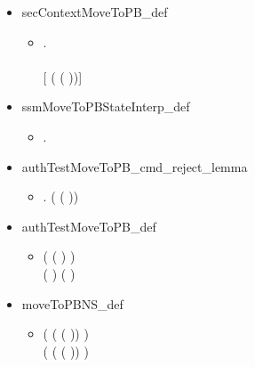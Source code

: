 \begin{itemize}
\item secContextMoveToPB_def
  \begin{itemize}
    \item [] \HOLTokenTurnstile{} \HOLSymConst{\HOLTokenForall{}}.
     \\  \HOLSymConst{=}
     \\{[    ( ( ))]}
   \end{itemize}
   \item ssmMoveToPBStateInterp_def
  \begin{itemize}
    \item [] \HOLTokenTurnstile{} \HOLSymConst{\HOLTokenForall{}}.   \HOLSymConst{=} 
    \end{itemize}
    \item authTestMoveToPB_cmd_reject_lemma
  \begin{itemize}
    \item [] \HOLTokenTurnstile{} \HOLSymConst{\HOLTokenForall{}}. \HOLSymConst{\HOLTokenNeg{}} ( ( ))
    \end{itemize}
    \item authTestMoveToPB_def
  \begin{itemize}
    \item [] \HOLTokenTurnstile{} ( (    ) \HOLSymConst{\HOLTokenEquiv{}} ) \HOLSymConst{\HOLTokenConj{}}
      \\(  \HOLSymConst{\HOLTokenEquiv{}} ) \HOLSymConst{\HOLTokenConj{}} (  \HOLSymConst{\HOLTokenEquiv{}} )
      \end{itemize}
   \item moveToPBNS_def
  \begin{itemize}
    \item [] \HOLTokenTurnstile{} (  ( ( )) \HOLSymConst{=} ) \HOLSymConst{\HOLTokenConj{}}
   \\(  ( ( )) \HOLSymConst{=} ) \HOLSymConst{\HOLTokenConj{}}

\end{itemize}
\end{itemize}
